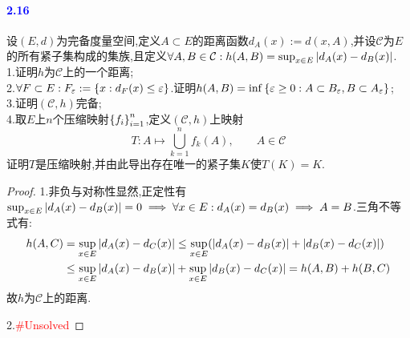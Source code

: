 \documentclass[UTF8]{article}
\newcommand{\parablue}[1]{\paragraph*{\textcolor{blue}{#1}}}
\newcommand{\unsolved}{\textcolor{red}{\#Unsolved}}
\begin{document}
\parablue{2.16}设$(E,d)$为完备度量空间,定义$A\subset E$的距离函数$d_A(x):=d(x,A)$,并设$\mathcal{C}$为$E$的所有紧子集构成的集族,且定义$ \forall A,B\in \mathcal{C}:h(A,B)=\sup_{x\in E}\left|d_A(x)-d_B(x)\right|$.\\
1.证明$h$为$\mathcal{C}$上的一个距离;\\
2.$\forall F\subset E:F_\varepsilon:=\left\{x:d_F(x)\leq \varepsilon\right\}$.证明$h(A,B)=\inf\left\{\varepsilon\geq 0:A\subset B_\varepsilon,B\subset A_\varepsilon\right\}$;\\
3.证明$(\mathcal{C},h)$完备;\\
4.取$E$上$n$个压缩映射$\left\{f_i\right\}_{i=1}^n$,定义$(\mathcal{C},h)$上映射$$T:A\mapsto \bigcup_{k=1}^n f_k(A),\qquad A\in \mathcal{C}$$证明$T$是压缩映射,并由此导出存在唯一的紧子集$K$使$T(K)=K$.
\begin{proof}
    1.非负与对称性显然,正定性有$\sup_{x\in E}\left|d_A(x)-d_B(x)\right|=0\implies \forall x\in E:d_A(x)=d_B(x)\implies A=B$.三角不等式有:
    $$\begin{aligned}
        h(A,C)&=\sup_{x\in E}\left|d_A(x)-d_C(x)\right|\leq \sup_{x\in E}\!\left(\left|d_A(x)-d_B(x)\right|+\left|d_B(x)-d_C(x)\right|\right)\\
        &\leq \sup_{x\in E}\left|d_A(x)-d_B(x)\right|+\sup_{x\in E}\left|d_B(x)-d_C(x)\right|=h(A,B)+h(B,C)
    \end{aligned}$$
    故$h$为$\mathcal{C}$上的距离.

    2.\unsolved
    



\end{proof}
\end{document}
